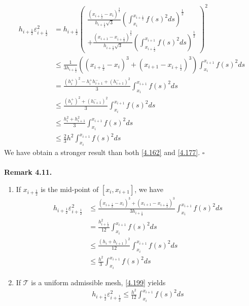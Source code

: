 \documentclass[a4paper]{article}
\numberwithin{equation}{section}
\begin{document}
\begin{align}
{h_{i + \frac{1}{2}}}\varepsilon _{i + \frac{1}{2}}^2 &= {h_{i + \frac{1}{2}}}{\left( \begin{array}{l}
\frac{{{{\left( {{x_{i + \frac{1}{2}}} - {x_i}} \right)}^{\frac{3}{2}}}}}{{{h_{i + \frac{1}{2}}}\sqrt 3 }}{\left( {\int_{{x_i}}^{{x_{i + \frac{1}{2}}}} {f{{\left( s \right)}^2}ds} } \right)^{\frac{1}{2}}}\\
 + \frac{{{{\left( {{x_{i + 1}} - {x_{i + \frac{1}{2}}}} \right)}^{\frac{3}{2}}}}}{{{h_{i + \frac{1}{2}}}\sqrt 3 }}{\left( {\int_{{x_{i + \frac{1}{2}}}}^{{x_{i + 1}}} {f{{\left( s \right)}^2}ds} } \right)^{\frac{1}{2}}}
\end{array} \right)^2}\\
& \le \frac{1}{{3{h_{i + \frac{1}{2}}}}}\left( {{{\left( {{x_{i + \frac{1}{2}}} - {x_i}} \right)}^3} + {{\left( {{x_{i + 1}} - {x_{i + \frac{1}{2}}}} \right)}^3}} \right)\int_{{x_i}}^{{x_{i + 1}}} {f{{\left( s \right)}^2}ds} \\
& = \frac{{{{\left( {h_i^ + } \right)}^2} - h_i^ + h_{i + 1}^ -  + {{\left( {h_{i + 1}^ - } \right)}^2}}}{3}\int_{{x_i}}^{{x_{i + 1}}} {f{{\left( s \right)}^2}ds} \\
& \le \frac{{{{\left( {h_i^ + } \right)}^2} + {{\left( {h_{i + 1}^ - } \right)}^2}}}{3}\int_{{x_i}}^{{x_{i + 1}}} {f{{\left( s \right)}^2}ds} \\
& \le \frac{{h_i^2 + h_{i + 1}^2}}{3}\int_{{x_i}}^{{x_{i + 1}}} {f{{\left( s \right)}^2}ds} \\
& \le \frac{2}{3}{h^2}\int_{{x_i}}^{{x_{i + 1}}} {f{{\left( s \right)}^2}ds} 
\end{align}
We have obtain a stronger result than both \eqref{4.162} and \eqref{4.177}. \hfill $\square$\\
\\
\textbf{Remark 4.11.} 
\begin{enumerate}
\item If ${x_{i + \frac{1}{2}}}$ is the mid-point of $\left[x_i,x_{i+1}\right]$, we have
\begin{align}
{h_{i + \frac{1}{2}}}\varepsilon _{i + \frac{1}{2}}^2 &\le \frac{{{{\left( {{x_{i + \frac{1}{2}}} - {x_i}} \right)}^3} + {{\left( {{x_{i + 1}} - {x_{i + \frac{1}{2}}}} \right)}^3}} }{{3{h_{i + \frac{1}{2}}}}}\int_{{x_i}}^{{x_{i + 1}}} {f{{\left( s \right)}^2}ds} \\
 &= \frac{{h_{i + \frac{1}{2}}^2}}{{12}}\int_{{x_i}}^{{x_{i + 1}}} {f{{\left( s \right)}^2}ds} \label{4.199}\\
 &\le \frac{{{{\left( {{h_i} + {h_{i + 1}}} \right)}^2}}}{{12}}\int_{{x_i}}^{{x_{i + 1}}} {f{{\left( s \right)}^2}ds} \\
 &\le \frac{{{h^2}}}{3}\int_{{x_i}}^{{x_{i + 1}}} {f{{\left( s \right)}^2}ds} 
\end{align}
\item If $\mathcal{T}$ is a uniform admissible mesh, \eqref{4.199} yields
\begin{align}
{h_{i + \frac{1}{2}}}\varepsilon _{i + \frac{1}{2}}^2 \le \frac{{{h^2}}}{{12}}\int_{{x_i}}^{{x_{i + 1}}} {f{{\left( s \right)}^2}ds} 
\end{align}
\end{enumerate}
\end{document}
